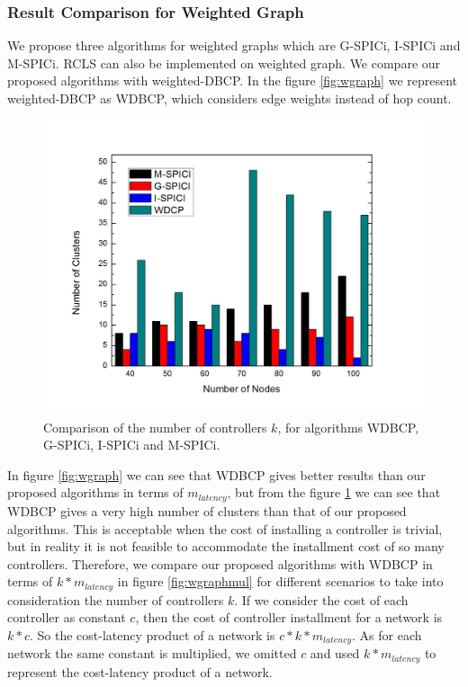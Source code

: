 \documentclass[a4paper,twocolumn,preprint]{elsarticle}
\begin{document}
\subsubsection{Result Comparison for Weighted Graph}
We propose three algorithms for weighted graphs which are G-SPICi, I-SPICi and M-SPICi. RCLS can also be implemented on weighted graph. We compare our proposed algorithms with weighted-DBCP. In the figure \ref{fig:wgraph} we represent weighted-DBCP as WDBCP, which considers edge weights instead of hop count.


\begin{figure}
	\includegraphics[width=\linewidth]{wbar.jpg}
	\caption{Comparison of the number of controllers $k$, for algorithms WDBCP, G-SPICi, I-SPICi and M-SPICi.}
	\label{fig:wbar}
\end{figure}


In figure \ref{fig:wgraph} we can see that WDBCP gives better results than our proposed algorithms in terms of $m_{latency}$, but from the figure \ref{fig:wbar} we can see that WDBCP gives a very high number of clusters than that of our proposed algorithms. This is acceptable when the cost of installing a controller is trivial, but in reality it is not feasible to accommodate the installment cost of so many controllers. Therefore, we compare our proposed algorithms with WDBCP in terms of $k*m_{latency}$ in figure \ref{fig:wgraphmul} for different scenarios to take into consideration the number of controllers $k$. If we consider the cost of each controller as constant $c$, then the cost of controller installment for a network is $k*c$. So the cost-latency product of a network is $c*k*m_{latency}$. As for each network the same constant is multiplied, we omitted $c$ and used $k*m_{latency}$ to represent the cost-latency product of a network.
\end{document}
